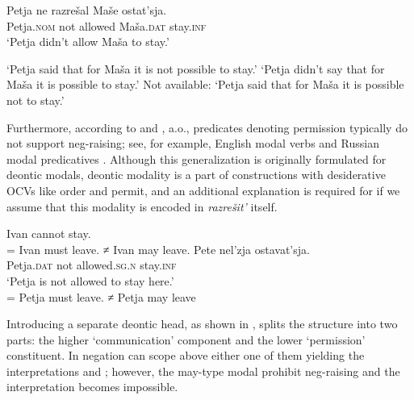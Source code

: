 \documentclass[output=paper,
colorlinks,
citecolor=brown,
newtxmath
]{langscibook}
\begin{document}
\ea\label{ex15} 
\gll Petja	 ne	razrešal	Maše	ostat’sja.\\
    Petja.\textsc{nom} not allowed Maša.\textsc{dat} stay.\textsc{inf}\\
\glt `Petja didn't allow Maša to stay.'

\ea\label{ex15a} 
`Petja said that for Maša it is not possible to stay.'
\ex\label{ex15b}
`Petja didn’t say that for Maša it is possible to stay.'
\ex\label{ex15c}
Not available: `Petja said that for Maša it is possible not to stay.'
\z
\z

\noindent Furthermore, according to \cite{vonFintelIatridou2007} and \cite{IatridouZeijlstra2013}, a.o., predicates denoting permission typically do not support neg-raising; see, for example, English modal verbs and Russian modal predicatives . Although this generalization is originally formulated for deontic modals, deontic modality is a part of constructions with desiderative OCVs like order and permit, and an additional explanation is required for  if we assume that this modality is encoded in \textit{razrešit’}  itself. 

\ea\label{ex16}
\ea\label{ex16a} 
Ivan cannot stay. \\
= Ivan must leave. ≠ Ivan may leave.
\ex\label{ex16b}
\gll Pete nel’zja ostavat’sja.\\ 
    Petja.\textsc{dat} {not allowed.\textsc{sg.n}} stay.\textsc{inf}\\
\glt `Petja is not allowed to stay here.' \\ 
	= Petja must leave. ≠ Petja may leave
\z
\z

\noindent Introducing a separate deontic head, as shown in , splits the structure into two parts: the higher `communication’ component and the lower `permission’ constituent. In  negation can scope above either one of them yielding the interpretations  and ; however, the may-type modal prohibit neg-raising and the interpretation  becomes impossible. \par
\end{document}
